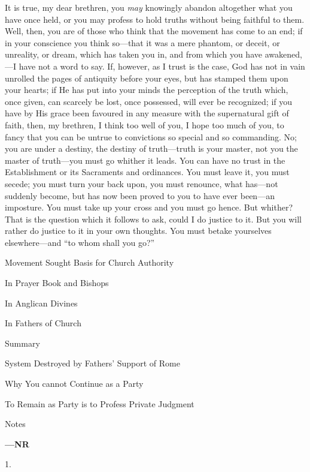 It is true, my dear brethren, you \emph{may} knowingly abandon
altogether what you have once held, or you may profess to hold truths
without being faithful to them. Well, then, you are of those who think
that the movement has come to an end; if in your conscience you think
so—that it was a mere phantom, or deceit, or unreality, or dream,
which has taken you in, and from which you have awakened,—I have not
a word to say. If, however, as I trust is the case, God has not in
vain unrolled the pages of antiquity before your eyes, but has stamped
them upon your hearts; if He has put into your minds the perception of
the truth which, once given, can scarcely be lost, once possessed,
will ever be recognized; if you have by His grace been favoured in any
measure with the supernatural gift of faith, then, my brethren, I
think too well of you, I hope too much of you, to fancy that you can
be untrue to convictions so special and so commanding. No; you are
under a destiny, the destiny of truth—truth is your master, not you
the master of truth—you must go whither it leads. You can have no
trust in the Establishment or its Sacraments and ordinances. You must
leave it, you must secede; you must turn your back upon, you must
renounce, what has—not suddenly become, but has now been proved to
you to have ever been—an imposture. You must take up your cross and
you must go hence. But whither? That is the question which it follows
to ask, could I do justice to it. But you will rather do justice to it
in your own thoughts. You must betake yourselves elsewhere—and
``to whom shall you go?''


Movement Sought Basis for Church
Authority

In Prayer Book and Bishops

In Anglican Divines

In Fathers of Church

Summary

System Destroyed by Fathers' Support of
Rome

Why You cannot Continue as a Party

To Remain as Party is to
Profess Private Judgment

Notes

\textbf{—NR}

1.

